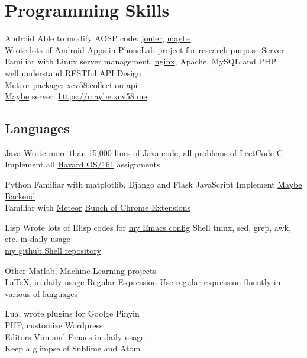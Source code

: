 

\section{Programming Skills}
\cvcomputer
{Android}{
  Able to modify AOSP code:
  \href{http://platform.phone-lab.org:8080/gitweb?p=platform/frameworks/base.git;a=search;h=refs/heads/experiment/1/jouler;s=Yihong+Chen;st=author}{jouler},
  \href{http://platform.phone-lab.org:8080/gitweb?p=platform/frameworks/base.git;a=search;h=refs/heads/experiment/3/maybe;s=Yihong+Chen;st=author}{maybe}
  \\Wrote lots of Android Apps in
  \href{https://phone-lab.org/}{PhoneLab} project for research purpose
}
{Server}{
  Familiar with Linux server management,
  \href{https://github.com/xcv58/nginx-config}{nginx}, Apache, MySQL and PHP
  \\well understand RESTful API Design
  \\Meteor package:
  \href{https://atmospherejs.com/xcv58/collection-api}{xcv58:collection-api}
  \\\href{http://blue.cse.buffalo.edu/projects/maybe}{Maybe} server: \href{https://maybe.xcv58.me}{https://maybe.xcv58.me}
}

\subsection{Languages}
\cvcomputer
{Java}{
  Wrote more than 15,000 lines of Java code, all problems of
  \href{https://github.com/xcv58/LeetCode}{LeetCode}
}
{C}{
  Implement all \href{http://www.eecs.harvard.edu/~syrah/os161/}{Havard OS/161} assignments
}

\cvcomputer
{Python}{
  Familiar with matplotlib, Django and Flask
}
{JavaScript}{
  Implement \href{https://maybe.xcv58.me}{Maybe Backend}\\
  Familiar with \href{https://www.meteor.com/}{Meteor}
  \href{https://chrome.google.com/webstore/search/xcv58?hl=en}{Bunch of Chrome Extensions}
}

\cvcomputer
{Lisp}{
  Wrote lots of Elisp codes for \href{https://github.com/xcv58/Emacs_config}{my Emacs config}
}
{Shell}{
  tmux, sed, grep, awk, etc. in daily usage\\
  \href{https://github.com/xcv58/Shell_script}{my github Shell repository}
}

\cvcomputer
{Other}{
  Matlab, Machine Learning projects\\
  {\LaTeX}, in daily usage
}
{Regular Expression}{
  Use regular expression fluently in various of languages
}

\cvcomputer
{}{
  Lua, wrote plugins for Goolge Pinyin\\
  PHP, customize Wordpress\\
}
{Editors}{
  \href{https://github.com/xcv58/Vim_config}{Vim} and
  \href{https://github.com/xcv58/Emacs_config}{Emacs} in daily usage\\
  Keep a glimpse of Sublime and Atom
}
